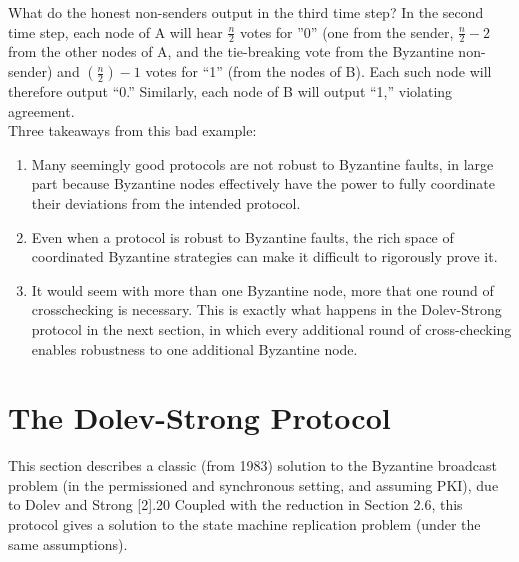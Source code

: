 What do the honest non-senders output in the third time step? In the second time step,
each node of A will hear $\frac{n}{2}$ votes for ”0” (one from the sender, $\frac{n}{2} - 2$ from the other
nodes of A, and the tie-breaking vote from the Byzantine non-sender) and $(\frac{n}{2}) - 1$ votes
for “1” (from the nodes of B). Each such node will therefore output “0.” Similarly, each
node of B will output “1,” violating agreement.\\
Three takeaways from this bad example:
\begin{enumerate}
    \item Many seemingly good protocols are not robust to Byzantine faults, in large part because
Byzantine nodes effectively have the power to fully coordinate their deviations from
the intended protocol.
    \item Even when a protocol is robust to Byzantine faults, the rich space of coordinated
Byzantine strategies can make it difficult to rigorously prove it.
    \item It would seem with more than one Byzantine node, more that one round of crosschecking is necessary. This is exactly what happens in the Dolev-Strong protocol in
the next section, in which every additional round of cross-checking enables robustness
to one additional Byzantine node.
\end{enumerate}


\section{The Dolev-Strong Protocol}
This section describes a classic (from 1983) solution to the Byzantine broadcast problem (in
the permissioned and synchronous setting, and assuming PKI), due to Dolev and Strong [2].20
Coupled with the reduction in Section 2.6, this protocol gives a solution to the state machine
replication problem (under the same assumptions).\\
